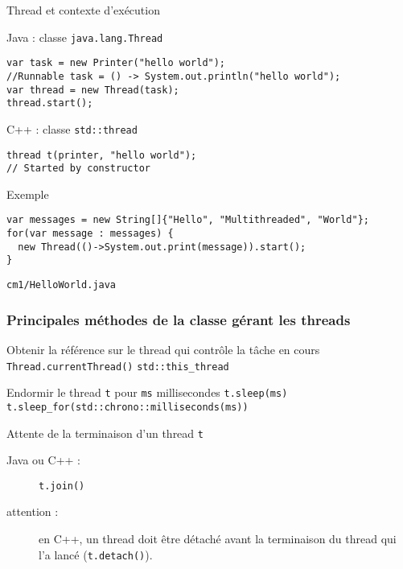 \begin{frame}[fragile]{Thread et contexte d'exécution}

  \begin{block}{Java : classe \lstinline{java.lang.Thread}}
     \begin{lstlisting}[numbers=none]
var task = new Printer("hello world");
//Runnable task = () -> System.out.println("hello world");
var thread = new Thread(task);
thread.start();
    \end{lstlisting}
    \end{block}

  \begin{block}{C++ : classe \lstinline{std::thread}}
    \begin{lstlisting}[numbers=none]
thread t(printer, "hello world");
// Started by constructor
   \end{lstlisting}
  \end{block}


  \begin{exampleblock}{Exemple}
    \begin{lstlisting}[numbers=none]
var messages = new String[]{"Hello", "Multithreaded", "World"};
for(var message : messages) {
  new Thread(()->System.out.print(message)).start();
}
   \end{lstlisting}
  \end{exampleblock}
\begin{citing}
\jitem \lstinline{cm1/HelloWorld.java}
\end{citing}
\end{frame}



\begin{frame}[fragile]
  \frametitle{Principales méthodes de la classe gérant les threads}

  \vfill
\begin{block}{Obtenir la référence sur le thread qui contrôle la tâche en cours}
    \lstinline|Thread.currentThread()| \hfill
    \lstinline|std::this_thread|
\end{block}
\pause
  \vfill
  \vfill
\begin{block}{Endormir le thread \lstinline{t} pour \lstinline{ms} millisecondes}
    \lstinline|t.sleep(ms)| \hfill
    \lstinline|t.sleep_for(std::chrono::milliseconds(ms))|
 \end{block}
  \vfill
  \vfill
\pause
\begin{block}{Attente de la terminaison d'un thread \lstinline{t}}
 \begin{description}
 \item[Java ou C++ :] \lstinline|t.join()|
  \item [\alert{ attention :}] en C++, un thread doit être détaché avant la terminaison du thread qui l'a lancé (\lstinline|t.detach()|). 
 \end{description}
\end{block}
  \vfill
\end{frame}

